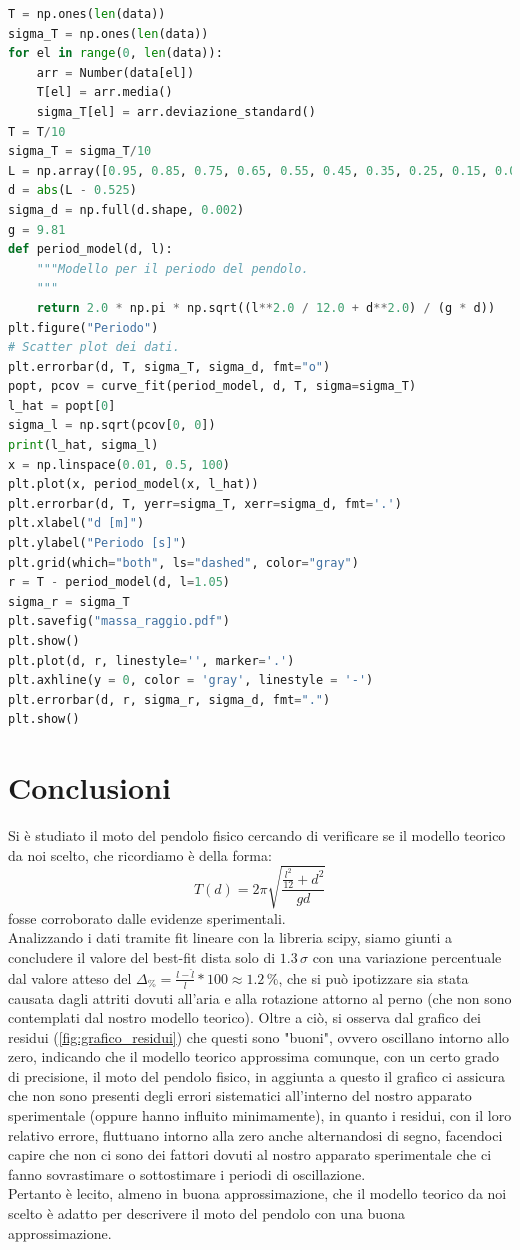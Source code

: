 \documentclass{article}
\begin{document}
\begin{minipage}{0.5\textwidth}
	\begin{lstlisting}[language=Python, firstnumber=24]
T = np.ones(len(data))
sigma_T = np.ones(len(data))
for el in range(0, len(data)):
    arr = Number(data[el])
    T[el] = arr.media()
    sigma_T[el] = arr.deviazione_standard()
T = T/10
sigma_T = sigma_T/10
L = np.array([0.95, 0.85, 0.75, 0.65, 0.55, 0.45, 0.35, 0.25, 0.15, 0.05])
d = abs(L - 0.525)
sigma_d = np.full(d.shape, 0.002) 
g = 9.81 
def period_model(d, l): 
    """Modello per il periodo del pendolo. 
    """ 
    return 2.0 * np.pi * np.sqrt((l**2.0 / 12.0 + d**2.0) / (g * d)) 
plt.figure("Periodo")
# Scatter plot dei dati. 
plt.errorbar(d, T, sigma_T, sigma_d, fmt="o")  
popt, pcov = curve_fit(period_model, d, T, sigma=sigma_T) 
l_hat = popt[0] 
sigma_l = np.sqrt(pcov[0, 0]) 
print(l_hat, sigma_l) 
x = np.linspace(0.01, 0.5, 100) 
plt.plot(x, period_model(x, l_hat))
plt.errorbar(d, T, yerr=sigma_T, xerr=sigma_d, fmt='.') 
plt.xlabel("d [m]") 
plt.ylabel("Periodo [s]")
plt.grid(which="both", ls="dashed", color="gray")
r = T - period_model(d, l=1.05)
sigma_r = sigma_T
plt.savefig("massa_raggio.pdf") 
plt.show()
plt.plot(d, r, linestyle='', marker='.')
plt.axhline(y = 0, color = 'gray', linestyle = '-') 
plt.errorbar(d, r, sigma_r, sigma_d, fmt=".")
plt.show()
	\end{lstlisting}
\end{minipage}
\newpage
\section{Conclusioni}
Si è studiato il moto del pendolo fisico cercando di verificare se il modello teorico da noi scelto, che ricordiamo è della forma:
$$
	T(d) = 2\pi\sqrt{\frac{\frac{l^2}{12} + d^2}{gd}}
$$
fosse corroborato dalle evidenze sperimentali. \\
Analizzando i dati tramite fit lineare con la libreria scipy, siamo giunti a concludere il valore del best-fit dista solo di $1.3 \, \sigma$ con una variazione percentuale dal valore atteso del $\Delta_\% = \frac{l - \hat{l}}{l} * 100 \approx 1.2 \, \%$, che si può ipotizzare sia stata causata dagli attriti dovuti all'aria e alla rotazione attorno al perno (che non sono contemplati dal nostro modello teorico). Oltre a ciò, si osserva dal grafico dei residui (\ref{fig:grafico_residui}) che questi sono "buoni", ovvero oscillano intorno allo zero, indicando che il modello teorico approssima comunque, con un certo grado di precisione, il moto del pendolo fisico, in aggiunta a questo il grafico ci assicura che non sono presenti degli errori sistematici all'interno del nostro apparato sperimentale (oppure hanno influito minimamente), in quanto i residui, con il loro relativo errore, fluttuano intorno alla zero anche alternandosi di segno, facendoci capire che non ci sono dei fattori dovuti al nostro apparato sperimentale che ci fanno sovrastimare o sottostimare i periodi di oscillazione. \\
Pertanto è lecito, almeno in buona approssimazione, che il modello teorico da noi scelto è adatto per descrivere il moto del pendolo con una buona approssimazione. \\
\end{document}
